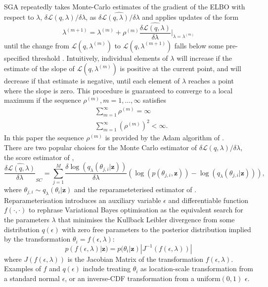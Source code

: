 \documentclass[12pt,a4paper]{article}\usepackage[]{graphicx}\usepackage[]{color}
\begin{document}
SGA repeatedly takes Monte-Carlo estimates of the gradient of the ELBO with respect to $\lambda$, $\delta\mathcal{L}(q, \lambda) / \delta \lambda$, as $\widehat{\delta\mathcal{L}(q, \lambda) / \delta \lambda}$ and applies updates of the form
\begin{equation}
\label{gradientAscent}
\lambda^{(m+1)} = \lambda^{(m)} + \rho^{(m)} \widehat{\frac{\delta\mathcal{L}(q, \lambda)}{\delta \lambda}} \bigg\rvert_{\lambda = \lambda^{(m)}}
\end{equation}
until the change from $\mathcal{L}(q, \lambda^{(m)})$ to $\mathcal{L}(q, \lambda^{(m+1)})$ falls below some pre-specified threshold \citep{Hoffman2013}. Intuitively, individual elements of $\lambda$ will increase if the estimate of the slope of $\mathcal{L}(q, \lambda^{(m)})$ is positive at the current point, and will decrease if that estimate is negative, until each element of $\lambda$ reaches a point where the slope is zero. This procedure is guaranteed to converge to a local maximum \citep{Robbins1951} if the sequence $\rho^{(m)}, m = 1, \dots, \infty$ satisfies
\begin{align}
&\sum_{m=1}^{\infty} \rho^{(m)} =  \infty \\
&\sum_{m=1}^{\infty} (\rho^{(m)})^2 <  \infty.
\end{align}
In this paper the sequence $\rho^{(m)}$ is provided by the Adam algorithm of \citet{Kingma2015b}.
\\

There are two popular choices for the Monte Carlo estimator of $\delta\mathcal{L}(q, \lambda) / \delta \lambda$, the score estimator of \citet{Ranganath2014}, 
\begin{equation}
\label{scoreDeriv}
\widehat{\frac{\delta\mathcal{L}(q, \lambda)}{\delta \lambda}}_{SC} = \sum_{j = 1}^M \frac{\delta \log(q_{\lambda}(\theta_{j, i} | \textbf{z}))}{\delta \lambda} \left(\log(p(\theta_{j, i}, \textbf{z})) - \log(q_{\lambda}(\theta_{j, i} | \textbf{z})) \right),
\end{equation}
where $\theta_{j, i} \sim q_{\lambda}(\theta_i | \textbf{z})$ and the reparameteterised estimator of \citet{Kingma2014}. Reparameterisation introduces an auxiliary variable $\epsilon$ and differentiable function $f(\cdot, \cdot)$ to rephrase Variational Bayes optimisation as the equivalent search for the parameters $\lambda$ that minimises the Kullback Leibler divergence from some distribution $q(\epsilon)$ with zero free parameters to the posterior distribution implied by the transformation $\theta_i = f(\epsilon, \lambda)$:
\begin{equation}
\label{rpDist}
p(f(\epsilon, \lambda) | \textbf{z}) = p(\theta_i | \textbf{z}) |J^{-1}(f(\epsilon, \lambda))|
\end{equation}
where $J(f(\epsilon, \lambda))$ is the Jacobian Matrix of the transformation $f(\epsilon, \lambda)$. Examples of $f$ and $q(\epsilon)$ include treating $\theta_i$ as location-scale transformation from a standard normal $\epsilon$, or an inverse-CDF transformation from a uniform$(0, 1)$ $\epsilon$. 
\\
\end{document}
